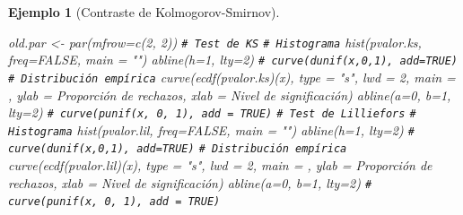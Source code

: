 \documentclass[
]{book}
\newenvironment{Shaded}{\begin{snugshade}}{\end{snugshade}}
\newcommand{\AttributeTok}[1]{\textcolor[rgb]{0.77,0.63,0.00}{#1}}
\newcommand{\CommentTok}[1]{\textcolor[rgb]{0.56,0.35,0.01}{\textit{#1}}}
\newcommand{\ConstantTok}[1]{\textcolor[rgb]{0.00,0.00,0.00}{#1}}
\newcommand{\DecValTok}[1]{\textcolor[rgb]{0.00,0.00,0.81}{#1}}
\newcommand{\FunctionTok}[1]{\textcolor[rgb]{0.00,0.00,0.00}{#1}}
\newcommand{\NormalTok}[1]{#1}
\newcommand{\OtherTok}[1]{\textcolor[rgb]{0.56,0.35,0.01}{#1}}
\newcommand{\StringTok}[1]{\textcolor[rgb]{0.31,0.60,0.02}{#1}}
\theoremstyle{break}
\newtheorem{example}{Ejemplo}[chapter]
\theoremstyle{nonumberplain}
\renewcommand{\CommentTok}[1]{\textcolor[rgb]{0.41,0.41,0.41}{\texttt{#1}}}
\begin{document}
\begin{example}[Contraste de Kolmogorov-Smirnov]
\begin{Shaded}
\begin{Highlighting}[]
\NormalTok{old.par }\OtherTok{\textless{}{-}} \FunctionTok{par}\NormalTok{(}\AttributeTok{mfrow=}\FunctionTok{c}\NormalTok{(}\DecValTok{2}\NormalTok{, }\DecValTok{2}\NormalTok{))}
\CommentTok{\# Test de KS}
  \CommentTok{\# Histograma}
\FunctionTok{hist}\NormalTok{(pvalor.ks, }\AttributeTok{freq=}\ConstantTok{FALSE}\NormalTok{, }\AttributeTok{main =} \StringTok{""}\NormalTok{)}
\FunctionTok{abline}\NormalTok{(}\AttributeTok{h=}\DecValTok{1}\NormalTok{, }\AttributeTok{lty=}\DecValTok{2}\NormalTok{)   }\CommentTok{\# curve(dunif(x,0,1), add=TRUE)}
  \CommentTok{\# Distribución empírica}
\FunctionTok{curve}\NormalTok{(}\FunctionTok{ecdf}\NormalTok{(pvalor.ks)(x), }\AttributeTok{type =} \StringTok{"s"}\NormalTok{, }\AttributeTok{lwd =} \DecValTok{2}\NormalTok{, }\AttributeTok{main =} \StringTok{\textquotesingle{}\textquotesingle{}}\NormalTok{, }
      \AttributeTok{ylab =} \StringTok{\textquotesingle{}Proporción de rechazos\textquotesingle{}}\NormalTok{, }\AttributeTok{xlab =} \StringTok{\textquotesingle{}Nivel de significación\textquotesingle{}}\NormalTok{)}
\FunctionTok{abline}\NormalTok{(}\AttributeTok{a=}\DecValTok{0}\NormalTok{, }\AttributeTok{b=}\DecValTok{1}\NormalTok{, }\AttributeTok{lty=}\DecValTok{2}\NormalTok{)   }\CommentTok{\# curve(punif(x, 0, 1), add = TRUE)}
\CommentTok{\# Test de Lilliefors}
  \CommentTok{\# Histograma}
\FunctionTok{hist}\NormalTok{(pvalor.lil, }\AttributeTok{freq=}\ConstantTok{FALSE}\NormalTok{, }\AttributeTok{main =} \StringTok{""}\NormalTok{)}
\FunctionTok{abline}\NormalTok{(}\AttributeTok{h=}\DecValTok{1}\NormalTok{, }\AttributeTok{lty=}\DecValTok{2}\NormalTok{)   }\CommentTok{\# curve(dunif(x,0,1), add=TRUE)}
  \CommentTok{\# Distribución empírica}
\FunctionTok{curve}\NormalTok{(}\FunctionTok{ecdf}\NormalTok{(pvalor.lil)(x), }\AttributeTok{type =} \StringTok{"s"}\NormalTok{, }\AttributeTok{lwd =} \DecValTok{2}\NormalTok{, }\AttributeTok{main =} \StringTok{\textquotesingle{}\textquotesingle{}}\NormalTok{, }
      \AttributeTok{ylab =} \StringTok{\textquotesingle{}Proporción de rechazos\textquotesingle{}}\NormalTok{,  }\AttributeTok{xlab =} \StringTok{\textquotesingle{}Nivel de significación\textquotesingle{}}\NormalTok{)}
\FunctionTok{abline}\NormalTok{(}\AttributeTok{a=}\DecValTok{0}\NormalTok{, }\AttributeTok{b=}\DecValTok{1}\NormalTok{, }\AttributeTok{lty=}\DecValTok{2}\NormalTok{)   }\CommentTok{\# curve(punif(x, 0, 1), add = TRUE)}
\end{Highlighting}
\end{Shaded}


\end{example}
\end{document}
